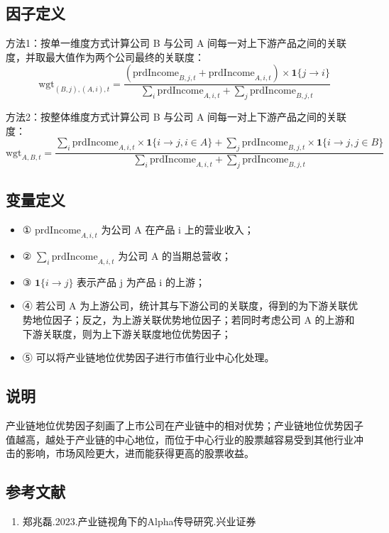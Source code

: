 \documentclass{article}
\begin{document}
\subsection{因子定义}
方法1：按单一维度方式计算公司 B 与公司 A 间每一对上下游产品之间的关联度，并取最大值作为两个公司最终的关联度：
\begin{equation}
    \mathrm{wgt}_{(B,j),(A,i),t} = \frac{(\mathrm{prdIncome}_{B,j,t} + \mathrm{prdIncome}_{A,i,t}) \times \mathbf{1}\{j \to i\}}{\sum_i \mathrm{prdIncome}_{A,i,t} + \sum_j \mathrm{prdIncome}_{B,j,t}}
\end{equation}

方法2：按整体维度方式计算公司 B 与公司 A 间每一对上下游产品之间的关联度：
\begin{equation}
    \mathrm{wgt}_{A,B,t} = \frac{\sum_i \mathrm{prdIncome}_{A,i,t} \times \mathbf{1}\{i \to j, i \in A\} + \sum_j \mathrm{prdIncome}_{B,j,t} \times \mathbf{1}\{i \to j, j \in B\}}{\sum_i \mathrm{prdIncome}_{A,i,t} + \sum_j \mathrm{prdIncome}_{B,j,t}}
\end{equation}

\subsection{变量定义}
\begin{itemize}
    \item ① \( \mathrm{prdIncome}_{A,i,t} \) 为公司 A 在产品 i 上的营业收入；
    \item ② \( \sum_i \mathrm{prdIncome}_{A,i,t} \) 为公司 A 的当期总营收；
    \item ③ \( \mathbf{1}\{i \to j\} \) 表示产品 j 为产品 i 的上游；
    \item ④ 若公司 A 为上游公司，统计其与下游公司的关联度，得到的为下游关联优势地位因子；反之，为上游关联优势地位因子；若同时考虑公司 A 的上游和下游关联度，则为上下游关联度地位优势因子；
    \item ⑤ 可以将产业链地位优势因子进行市值行业中心化处理。
\end{itemize}

\subsection{说明}
产业链地位优势因子刻画了上市公司在产业链中的相对优势；产业链地位优势因子值越高，越处于产业链的中心地位，而位于中心行业的股票越容易受到其他行业冲击的影响，市场风险更大，进而能获得更高的股票收益。

\subsection{参考文献}
\begin{enumerate}
    \item 郑兆磊.2023.产业链视角下的Alpha传导研究.兴业证券
\end{enumerate}
\end{document}
